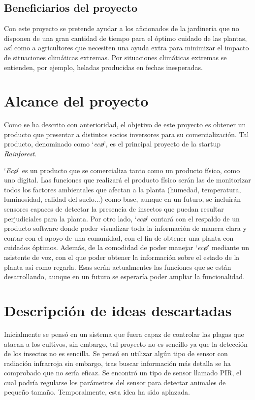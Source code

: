 \documentclass[runningheads]{llncs}
\begin{document}
    \subsection{Beneficiarios del proyecto}
    Con este proyecto se pretende ayudar a los aficionados de la jardinería que no disponen de una gran cantidad de tiempo para el óptimo cuidado de las plantas, así como a agricultores que necesiten una ayuda extra para minimizar el impacto de situaciones climáticas extremas. Por situaciones climáticas extremas se entienden, por ejemplo, heladas producidas en fechas inesperadas.
    
\section{Alcance del proyecto}
Como se ha descrito con anterioridad, el objetivo de este proyecto es obtener un producto que presentar a distintos socios inversores para su comercialización. Tal producto, denominado como `\textit{ec\textbf{\o}}', es  el principal proyecto de la startup \textit{Rainforest}.

`\textit{Ec\textbf{\o}}' es un producto que se comercializa tanto como un producto físico, como uno digital. Las funciones que realizará el producto físico serán las de monitorizar todos los factores ambientales que afectan a la planta (humedad, temperatura, luminosidad, calidad del suelo...) como base, aunque en un futuro, se incluirán sensores capaces de detectar la presencia de insectos que puedan resultar perjudiciales para la planta. Por otro lado, `\textit{ec\textbf{\o}}' contará con el respaldo de un producto software donde poder visualizar toda la información de manera clara y contar con el apoyo de una comunidad, con el fin de obtener una planta con cuidados óptimos. Además, de la comodidad de poder manejar `\textit{ec\textbf{\o}}' mediante un asistente de voz, con el que poder obtener la información sobre el estado de la planta así como regarla. Esas serán actualmentes las funciones que se están desarrollando, aunque en un futuro se esperaría poder ampliar la funcionalidad.
\section{Descripción de ideas descartadas}

Inicialmente se pensó en un sistema que fuera capaz de controlar las plagas que atacan a los cultivos, sin embargo, tal proyecto no es sencillo ya que la detección de los insectos no es sencilla. Se pensó en utilizar algún tipo de sensor con radiación infrarroja sin embargo, tras buscar información más detalla se ha comprobado que no sería eficaz. Se encontró un tipo de sensor llamado PIR, el cual podría regularse los parámetros del sensor para detectar animales de pequeño tamaño. Temporalmente, esta idea ha sido aplazada.
\end{document}
